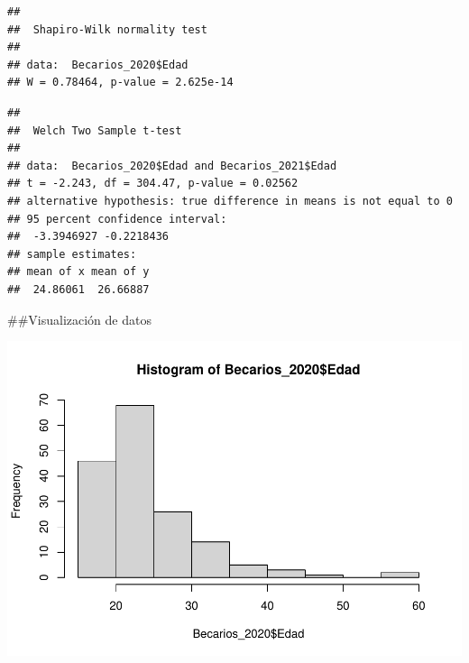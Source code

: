 \documentclass[
]{article}
\newenvironment{Shaded}{\begin{snugshade}}{\end{snugshade}}
\newcommand{\FunctionTok}[1]{\textcolor[rgb]{0.00,0.00,0.00}{#1}}
\newcommand{\NormalTok}[1]{#1}
\newcommand{\SpecialCharTok}[1]{\textcolor[rgb]{0.00,0.00,0.00}{#1}}
\begin{document}
\begin{Shaded}
\end{Shaded}

\begin{verbatim}
## 
##  Shapiro-Wilk normality test
## 
## data:  Becarios_2020$Edad
## W = 0.78464, p-value = 2.625e-14
\end{verbatim}

\begin{Shaded}
\end{Shaded}

\begin{verbatim}
## 
##  Welch Two Sample t-test
## 
## data:  Becarios_2020$Edad and Becarios_2021$Edad
## t = -2.243, df = 304.47, p-value = 0.02562
## alternative hypothesis: true difference in means is not equal to 0
## 95 percent confidence interval:
##  -3.3946927 -0.2218436
## sample estimates:
## mean of x mean of y 
##  24.86061  26.66887
\end{verbatim}

\#\#Visualización de datos

\begin{Shaded}
\end{Shaded}

\includegraphics{1-Lectura-de-datos_files/figure-latex/Histograma-1.pdf}
\end{document}
